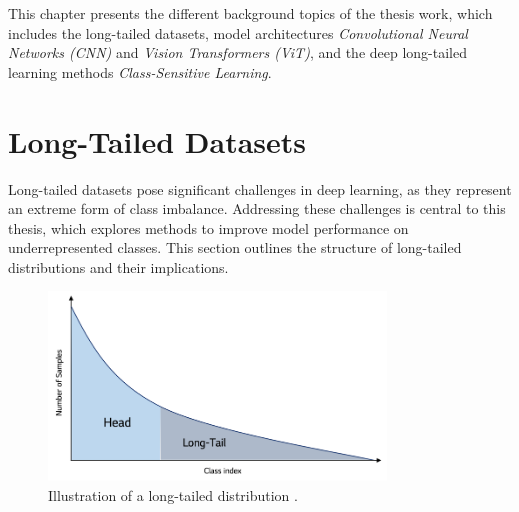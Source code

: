 
This chapter presents the different background topics of the thesis work, which includes the long-tailed datasets, model architectures \textit{Convolutional Neural Networks (CNN)} and \textit{Vision Transformers (ViT)}, and the deep long-tailed learning methods \textit{Class-Sensitive Learning}.


\section{Long-Tailed Datasets}
\label{sec:lt-datasets}
Long-tailed datasets pose significant challenges in deep learning, as they represent an extreme form of class imbalance. Addressing these challenges is central to this thesis, which explores methods to improve model performance on underrepresented classes. This section outlines the structure of long-tailed distributions and their implications.

\begin{figure}[ht]
    \centering
    \includegraphics[width=0.8\textwidth]{Images/long_tail_distribution.png} 
    \caption{Illustration of a long-tailed distribution \cite{lgresearch257}. }
    \label{fig:lt_distribution} 
\end{figure}

